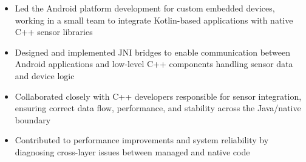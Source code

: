 \documentclass[a4paper]{article}
\begin{document}
\begin{cvExperience}
{\begin{cvJob}
      \begin{itemize}
        \item Led the Android platform development for custom embedded devices, working in a
              small team to integrate Kotlin-based applications with native C++ sensor
              libraries

        \item Designed and implemented JNI bridges to enable communication between Android
              applications and low-level C++ components handling sensor data and device logic

        \item Collaborated closely with C++ developers responsible for sensor integration,
              ensuring correct data flow, performance, and stability across the Java/native
              boundary

        \item Contributed to performance improvements and system reliability by diagnosing
              cross-layer issues between managed and native code

      \end{itemize}
    \end{cvJob}
  }

\end{cvExperience}
\end{document}
